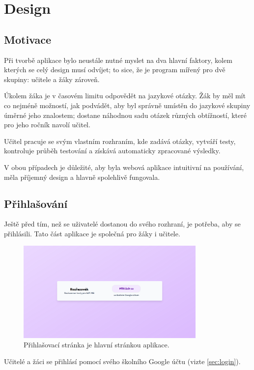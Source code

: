 \hypertarget{Design}{\chapter{Design}}

\section{Motivace}

Při tvorbě aplikace bylo neustále nutné myslet na dva hlavní faktory, kolem kterých se celý design musí odvíjet; to sice, že je program mířený pro dvě skupiny: učitele a žáky zároveň. 

Úkolem žáka je v časovém limitu odpovědět na jazykové otázky. Žák by měl mít co nejméně možností, jak podvádět, aby byl správně umístěn do jazykové skupiny úměrné jeho znalostem; dostane náhodnou sadu otázek různých obtížností, které pro jeho ročník navolí učitel.

Učitel pracuje se svým vlastním rozhraním, kde zadává otázky, vytváří testy, kontroluje průběh testování a získává automaticky zpracované výsledky.

V obou případech je důležité, aby byla webová aplikace intuitivní na používání, měla příjemný design a hlavně spolehlivě fungovala.

\section{Přihlašování}
\label{sec:login-design}

Ještě před tím, než se uživatelé dostanou do svého rozhraní, je potřeba, aby se přihlásili. Tato část aplikace je společná pro žáky i učitele. 

\begin{figure}[H]
    \centering
    \includegraphics[width=350px]{images/01design/login.png}
    \caption{Přihlašovací stránka je hlavní stránkou aplikace.}
\end{figure}

Učitelé a žáci se přihlásí pomocí svého školního Google účtu (vizte \ref{sec:login}).

